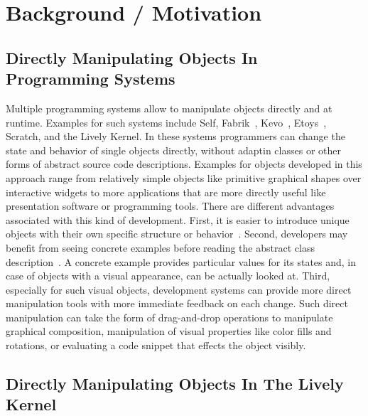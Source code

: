 \chapter{Background / Motivation} \label{sec:BACKGROUND}




\section{Directly Manipulating Objects In Programming Systems}

Multiple programming systems allow to manipulate objects directly and at runtime.
Examples for such systems include Self, Fabrik~\cite{Ingalls1988FVP}, Kevo~\cite{Tailvalsaari1992Kevo}, Etoys~\cite{Kay2005Etoys}, Scratch\cite{Maloney2010SPL}, and the Lively Kernel.
In these systems programmers can change the state and behavior of single objects directly, without adaptin classes or other forms of abstract source code descriptions. 
Examples for objects developed in this approach range from relatively simple objects like primitive graphical shapes over interactive widgets to more applications that are more directly useful like presentation software or programming tools.
There are different advantages associated with this kind of development.
First, it is easier to introduce unique objects with their own specific structure or behavior~. 
Second, developers may benefit from seeing concrete examples before reading the abstract class description~.
A concrete example provides particular values for its states and, in case of objects with a visual appearance, can be actually looked at.
Third, especially for such visual objects, development systems can provide more direct manipulation tools with more immediate feedback on each change.
Such direct manipulation can take the form of drag-and-drop operations to manipulate graphical composition, manipulation of visual properties like color fills and rotations, or evaluating a code snippet that effects the object visibly.



\section{Directly Manipulating Objects In The Lively Kernel}


